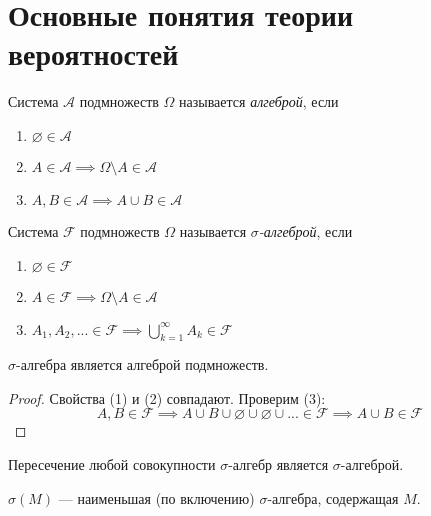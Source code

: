 \section{Основные понятия теории вероятностей}
        \begin{definition}\label{lect01:def1}
            Система $\mathcal{A}$ подмножеств $\Omega$ называется \emph{алгеброй}, если
            \begin{enumerate}
                \item $\varnothing \in \mathcal{A}$
                \item $A \in \mathcal{A} \implies \Omega \setminus A \in \mathcal{A}$
                \item $A, B \in \mathcal{A} \implies A \cup B \in \mathcal{A}$
            \end{enumerate}
        \end{definition}
        \begin{definition}\label{lect01:def2}
            Система $\mathcal{F}$ подмножеств $\Omega$ называется \emph{$\sigma$-алгеброй}, если
            \begin{enumerate}
                \item $\varnothing \in \mathcal{F}$
                \item $A \in \mathcal{F} \implies \Omega \setminus A \in \mathcal{A}$
                \item $A_1, A_2, ... \in \mathcal{F} \implies \bigcup\limits_{k=1}^{\infty}A_k \in \mathcal{F}$
            \end{enumerate}
        \end{definition}
        \begin{prop}\label{lect01:prop1}
            $\sigma$-алгебра является алгеброй подмножеств.
        \end{prop}
        \begin{proof}
            Свойства (1) и (2) совпадают. Проверим (3): 
            \begin{equation*}
            A, B \in \mathcal{F} \implies A \cup B \cup \varnothing \cup \varnothing \cup ... \in \mathcal{F} \implies A \cup B \in \mathcal{F}
            \end{equation*}
        \end{proof}
        \begin{prop}\label{lect01:prop2}
            Пересечение любой совокупности $\sigma$-алгебр является $\sigma$-алгеброй.
        \end{prop}
        \begin{definition}\label{lect01:def3}
            $\sigma(M)$ --- наименьшая (по включению) $\sigma$-алгебра, содержащая $M$.
        \end{definition}
